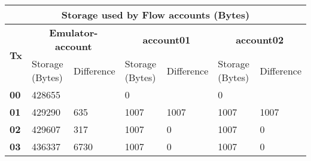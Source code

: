 \documentclass[../NFTComp_IEEE.tex]{subfiles}
\begin{document}
\begin{table}[ht]
{\begin{tabular}{lllllll}
            \hline
            \multicolumn{7}{|c|}{\textbf{Storage used by Flow accounts (Bytes)}}                                                                                                                                                                                                                                                                   \\ \hline
            \multicolumn{1}{|c|}{\multirow{2}{*}{\textbf{Tx}}} & \multicolumn{2}{c|}{\textbf{Emulator-account}}                                     & \multicolumn{2}{c|}{\textbf{account01}} & \multicolumn{2}{c|}{\textbf{account02}}                                                                                                            \\ \cline{2-7}
            \multicolumn{1}{|c|}{}                             & \multicolumn{1}{l|}{Storage (Bytes)}                                               & \multicolumn{1}{l|}{Difference}         & \multicolumn{1}{l|}{Storage (Bytes)}    & \multicolumn{1}{l|}{Difference} & \multicolumn{1}{l|}{Storage (Bytes)} & \multicolumn{1}{l|}{Difference} \\ \hline \hline
            \multicolumn{1}{|l|}{\textbf{00}}                  & \multicolumn{1}{l|}{428655}                                                        & \multicolumn{1}{l|}{}                   & \multicolumn{1}{l|}{0}                  & \multicolumn{1}{l|}{}           & \multicolumn{1}{l|}{0}               & \multicolumn{1}{l|}{}           \\ \hline
            \multicolumn{1}{|l|}{\textbf{01}}                  & \multicolumn{1}{l|}{429290}                                                        & \multicolumn{1}{l|}{635}                & \multicolumn{1}{l|}{1007}               & \multicolumn{1}{l|}{1007}       & \multicolumn{1}{l|}{1007}            & \multicolumn{1}{l|}{1007}       \\ \hline
            \multicolumn{1}{|l|}{\textbf{02}}                  & \multicolumn{1}{l|}{429607}                                                        & \multicolumn{1}{l|}{317}                & \multicolumn{1}{l|}{1007}               & \multicolumn{1}{l|}{0}          & \multicolumn{1}{l|}{1007}            & \multicolumn{1}{l|}{0}          \\ \hline
            \multicolumn{1}{|l|}{\textbf{03}}                  & \multicolumn{1}{l|}{436337}                                                        & \multicolumn{1}{l|}{6730}               & \multicolumn{1}{l|}{1007}               & \multicolumn{1}{l|}{0}          & \multicolumn{1}{l|}{1007}            & \multicolumn{1}{l|}{0}          \\ \hline

\end{tabular}}
\end{table}
\end{document}
